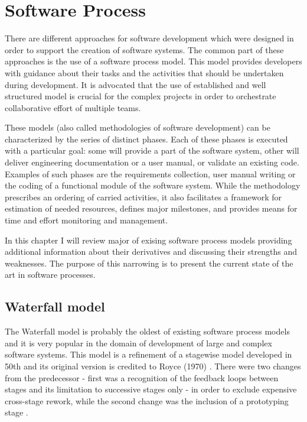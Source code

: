 \chapter{Software Process}
There are different approaches for software development which were designed in order to 
support the creation of software systems. The common part of these approaches is the use 
of a software process model. This model provides developers with guidance about their tasks 
and the activities that should be undertaken during development. It is advocated that the 
use of established and well structured model is crucial for the complex projects in order 
to orchestrate collaborative effort of multiple teams. 

These models (also called methodologies of software development) can be characterized 
by the series of distinct phases. 
Each of these phases is executed with a particular goal: some will provide a part of the 
software system, other will deliver engineering documentation or a user manual, or 
validate an existing code. Examples of such phases are the requirements collection, 
user manual writing or the coding of a functional module of the software system. 
While the methodology prescribes an ordering of carried activities, it also facilitates
a framework for estimation of needed resources, defines major milestones, and provides 
means for time and effort monitoring and management. 

In this chapter I will review major of exising software process models providing additional 
information about their derivatives and discussing their strengths and weaknesses.
The purpose of this narrowing is to present the current state of the art in software 
processes.

\section{Waterfall model}
The Waterfall model is probably the oldest of existing software process models and it is 
very popular in the domain of development of large and complex software systems. 
This model is a refinement of a stagewise model developed in 50th and its 
original version is credited to Royce (1970) \cite{citeulike:9982731}. There were two 
changes from the predecessor - first was a recognition of the feedback loops between 
stages and its limitation to successive stages only - in order to exclude expensive
cross-stage rework, while the second change was the inclusion of a prototyping stage
\cite{Boehm95anchoringthe}.

